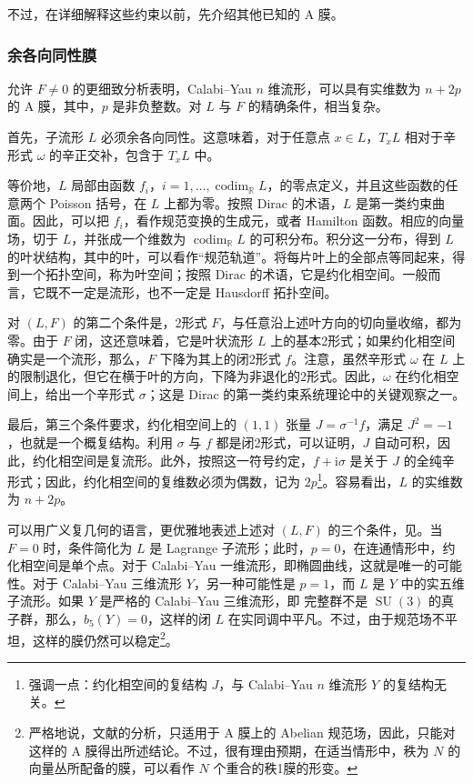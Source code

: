 不过，在详细解释这些约束以前，先介绍其他已知的 A 膜。

\subsubsection{余各向同性膜}\label{sec:3.6.1.1}

允许 $F\ne0$ 的更细致分析表明，Calabi--Yau $n$ 维流形，可以具有实维数为 $n+2p$ 的 A 膜，其中，$p$ 是非负整数。对 $L$ 与 $F$ 的精确条件，相当复杂。
\begin{definition*}\label{def:3.coisotropic-submanifold}
首先，子流形 $L$ 必须余各向同性。这意味着，对于任意点 $x\in L$，$T_xL$ 相对于辛形式 $\omega$ 的辛正交补，包含于 $T_xL$ 中。
\end{definition*}
等价地，$L$ 局部由函数 $f_i$，$i=1,\ldots,\operatorname{codim}_{\mathbb{R}}L$，的零点定义，并且这些函数的任意两个 Poisson 括号，在 $L$ 上都为零。按照 Dirac 的术语，$L$ 是第一类约束曲面。因此，可以把 $f_i$，看作规范变换的生成元，或者 Hamilton 函数。相应的向量场，切于 $L$，并张成一个维数为 $\operatorname{codim}_{\mathbb{R}}L$ 的可积分布。积分这一分布，得到 $L$ 的叶状结构，其中的叶，可以看作“规范轨道”。将每片叶上的全部点等同起来，得到一个拓扑空间，称为叶空间；按照 Dirac 的术语，它是约化相空间。一般而言，它既不一定是流形，也不一定是 Hausdorff 拓扑空间。

对 $(L,F)$ 的第二个条件是，2形式 $F$，与任意沿上述叶方向的切向量收缩，都为零。由于 $F$ 闭，这还意味着，它是叶状流形 $L$ 上的基本2形式；如果约化相空间确实是一个流形，那么，$F$ 下降为其上的闭2形式 $f$。注意，虽然辛形式 $\omega$ 在 $L$ 上的限制退化，但它在横于叶的方向，下降为非退化的2形式。因此，$\omega$ 在约化相空间上，给出一个辛形式 $\sigma$；这是 Dirac 的第一类约束系统理论中的关键观察之一。

最后，第三个条件要求，约化相空间上的 $(1,1)$ 张量 $J=\sigma^{-1}f$，满足 $J^2=-1$，也就是一个概复结构。利用 $\sigma$ 与 $f$ 都是闭2形式，可以证明，$J$ 自动可积，因此，约化相空间是复流形。此外，按照这一符号约定，$f+\mathrm{i}\sigma$ 是关于 $J$ 的全纯辛形式；因此，约化相空间的复维数必须为偶数，记为 $2p$\footnote{强调一点：约化相空间的复结构 $J$，与 Calabi--Yau $n$ 维流形 $Y$ 的复结构无关。}。容易看出，$L$ 的实维数为 $n+2p$。

可以用广义复几何的语言，更优雅地表述上述对 $(L,F)$ 的三个条件，见。当 $F=0$ 时，条件简化为 $L$ 是 Lagrange 子流形；此时，$p=0$，在连通情形中，约化相空间是单个点。对于 Calabi--Yau 一维流形，即椭圆曲线，这就是唯一的可能性。对于 Calabi--Yau 三维流形 $Y$，另一种可能性是 $p=1$，而 $L$ 是 $Y$ 中的实五维子流形。如果 $Y$ 是严格的 Calabi--Yau 三维流形，即 完整群不是 $\operatorname{SU}(3)$ 的真子群，那么，$b_5(Y)=0$，这样的闭 $L$ 在实同调中平凡。不过，由于规范场不平坦，这样的膜仍然可以稳定\footnote{严格地说，文献的分析，只适用于 A 膜上的 Abelian 规范场，因此，只能对这样的 A 膜得出所述结论。不过，很有理由预期，在适当情形中，秩为 $N$ 的向量丛所配备的膜，可以看作 $N$ 个重合的秩1膜的形变。}。


